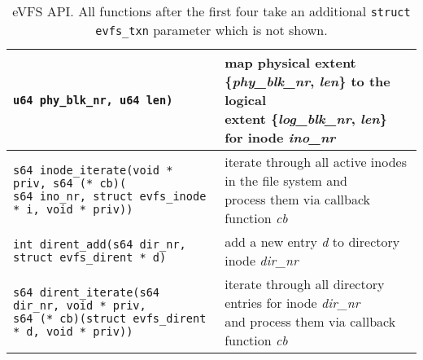 \begin{table*}
\begin{center}
\begin{small}
\begin{tabular}[t]{|l|l|}
{\hspace{7.35em}\texttt{u64 phy\_blk\_nr, u64 len)}} & \makecell[l]{map physical extent \{\textit{phy\_blk\_nr}, \textit{len}\} to the logical \\ extent \{\textit{log\_blk\_nr}, \textit{len}\} for inode \textit{ino\_nr}} \\
\hline 
\makecell[l]{\texttt{s64 inode\_iterate(void * priv, s64 (* cb)(} \\ 
\hspace{1em}\texttt{s64 ino\_nr, struct evfs\_inode * i, void * priv))}} & \makecell[l]{iterate through all active inodes in the file system and \\ process them via callback function \textit{cb}} \\
\hline
\hline
\texttt{int dirent\_add(s64 dir\_nr, struct evfs\_dirent * d)} & add a new entry \textit{d} to directory inode \textit{dir\_nr} \\
\hline 
\makecell[l]{\texttt{s64 dirent\_iterate(s64 dir\_nr, void * priv,} \\ 
\hspace{1em}\texttt{s64 (* cb)(struct evfs\_dirent * d, void * priv))}} & \makecell[l]{iterate through all directory entries for inode \textit{dir\_nr} \\ and process them via callback function \textit{cb}} \\
\hline
\end{tabular}
\end{small}
\end{center}
\vspace{-16pt}
\caption{\label{tab:evfs-api}eVFS API. All functions after the first four take an additional \texttt{struct evfs\_txn} parameter which is not shown.}
\vspace{-6pt}
\end{table*}

